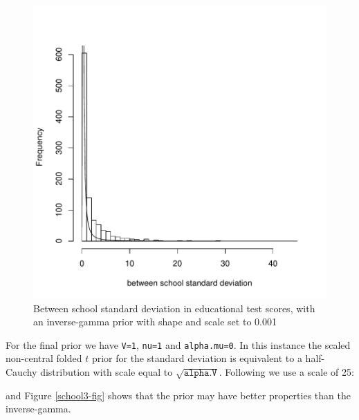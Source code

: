 \documentclass{article}
\begin{document}
\begin{figure}[!h]
\begin{center}
\includegraphics{Lecture8-014}
\end{center}
\caption{Between school standard deviation in educational test scores, with an inverse-gamma prior with shape and scale set to 0.001}
\label{school2-fig}
\end{figure}

For the final prior we have \texttt{V=1}, \texttt{nu=1} and \texttt{alpha.mu=0}.  In this instance the scaled non-central folded $t$ prior for the standard deviation is equivalent to a half-Cauchy distribution with scale equal to $\sqrt{\texttt{alpha.V}}$. Following \citet{Gelman.2006} we use a scale of 25: 

\begin{Schunk}
\end{Schunk}

and Figure \ref{school3-fig} shows that the prior may have better properties than the inverse-gamma.
\end{document}

